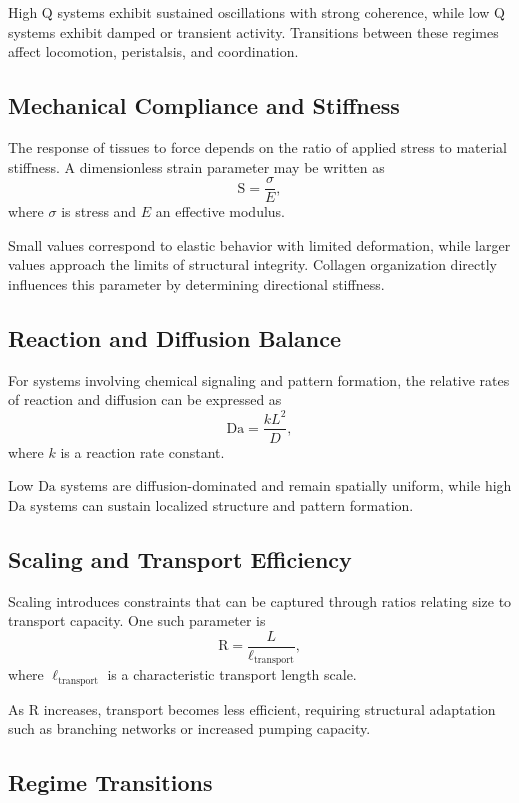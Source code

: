 \documentclass[11pt,oneside]{book}
\begin{document}
High $\mathrm{Q}$ systems exhibit sustained oscillations with strong coherence, while low $\mathrm{Q}$ systems exhibit damped or transient activity. Transitions between these regimes affect locomotion, peristalsis, and coordination.

\subsection{Mechanical Compliance and Stiffness}

The response of tissues to force depends on the ratio of applied stress to material stiffness. A dimensionless strain parameter may be written as
\[
\mathrm{S} = \frac{\sigma}{E},
\]
where $\sigma$ is stress and $E$ an effective modulus.

Small values correspond to elastic behavior with limited deformation, while larger values approach the limits of structural integrity. Collagen organization directly influences this parameter by determining directional stiffness.

\subsection{Reaction and Diffusion Balance}

For systems involving chemical signaling and pattern formation, the relative rates of reaction and diffusion can be expressed as
\[
\mathrm{Da} = \frac{k L^2}{D},
\]
where $k$ is a reaction rate constant.

Low $\mathrm{Da}$ systems are diffusion-dominated and remain spatially uniform, while high $\mathrm{Da}$ systems can sustain localized structure and pattern formation.

\subsection{Scaling and Transport Efficiency}

Scaling introduces constraints that can be captured through ratios relating size to transport capacity. One such parameter is
\[
\mathrm{R} = \frac{L}{\ell_{\mathrm{transport}}},
\]
where $\ell_{\mathrm{transport}}$ is a characteristic transport length scale.

As $\mathrm{R}$ increases, transport becomes less efficient, requiring structural adaptation such as branching networks or increased pumping capacity.

\subsection{Regime Transitions}
\end{document}

